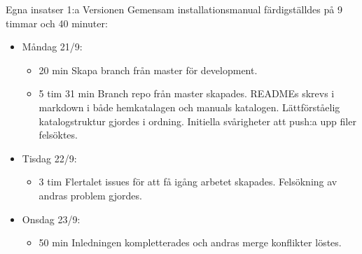 \documentclass{TDP003mall}
\begin{document}
Egna insatser 1:a Versionen Gemensam installationsmanual färdigställdes på 9 timmar och 40 minuter:
\begin{itemize}
  \item Måndag 21/9:
  \begin{itemize}
    \item 20 min Skapa branch från master för development.
    \item 5  tim 31 min Branch repo från master skapades. READMEs skrevs i markdown i både hemkatalagen och manuals katalogen. Lättförståelig katalogstruktur gjordes i ordning. Initiella svårigheter att push:a upp filer felsöktes.
  \end{itemize}
  \item Tisdag 22/9:
  \begin{itemize}
                \item 3 tim Flertalet issues för att få igång arbetet skapades. Felsökning av andras problem gjordes.
        \end{itemize}
        \item Onsdag 23/9:
        \begin{itemize}
                \item 50 min Inledningen kompletterades och andras merge konflikter löstes.\\
  \end{itemize}
\end{itemize}
\end{document}
